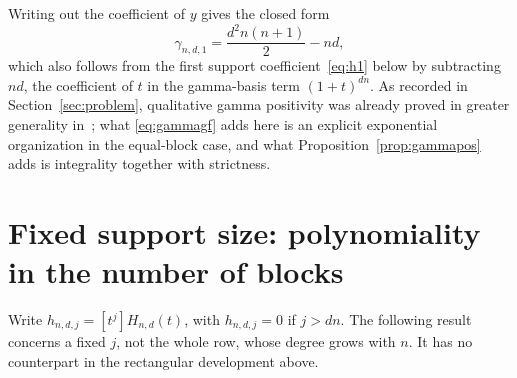 \documentclass[11pt]{article}
\numberwithin{equation}{section}
\theoremstyle{definition}
\begin{document}
Writing out the coefficient of $y$ gives the closed form
\begin{equation}
 \gamma_{n,d,1}=\frac{d^2n(n+1)}2-nd,
 \label{eq:gamma1}
\end{equation}
which also follows from the first support coefficient~\eqref{eq:h1} below by
subtracting $nd$, the coefficient of $t$ in the gamma-basis term $(1+t)^{dn}$.
As recorded in Section~\ref{sec:problem}, qualitative gamma positivity was
already proved in greater generality in~\cite{A}; what
\eqref{eq:gammagf} adds here is an explicit exponential organization in the
equal-block case, and what Proposition~\ref{prop:gammapos} adds is
integrality together with strictness.

\section{Fixed support size: polynomiality in the number of blocks}
\label{sec:fixed}

Write $h_{n,d,j}=[t^j]H_{n,d}(t)$, with $h_{n,d,j}=0$ if $j>dn$. The following
result concerns a fixed $j$, not the whole row, whose degree grows with $n$.
It has no counterpart in the rectangular development above.
\end{document}
